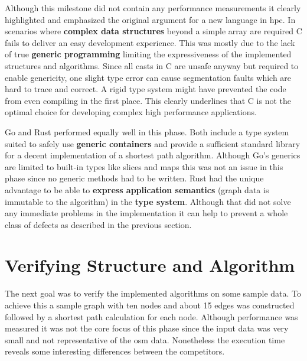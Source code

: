 Although this milestone did not contain any performance measurements it clearly highlighted and emphasized the original argument for a new language in \acrlong{hpc}. In scenarios where \textbf{complex data structures} beyond a simple array are required C fails to deliver an easy development experience. This was mostly due to the lack of true \textbf{generic programming} limiting the expressiveness of the implemented structures and algorithms. Since all casts in C are unsafe anyway but required to enable genericity, one slight type error can cause segmentation faults which are hard to trace and correct. A rigid type system might have prevented the code from even compiling in the first place. This clearly underlines that C is not the optimal choice for developing complex high performance applications.

Go and Rust performed equally well in this phase. Both include a type system suited to safely use \textbf{generic containers} and provide a sufficient standard library for a decent implementation of a shortest path algorithm. Although Go's generics are limited to built-in types like slices and maps this was not an issue in this phase since no generic methods had to be written. Rust had the unique advantage to be able to \textbf{express application semantics} (graph data is immutable to the algorithm) in the \textbf{type system}. Although that did not solve any immediate problems in the implementation it can help to prevent a whole class of defects as described in the previous section.

\section{Verifying Structure and Algorithm}
\label{sec:Implementation::Verification}

The next goal was to verify the implemented algorithms on some sample data. To achieve this a sample graph with ten nodes and about 15 edges was constructed followed by a shortest path calculation for each node. Although performance was measured it was not the core focus of this phase since the input data was very small and not representative of the \gls{osm} data. Nonetheless the execution time reveals some interesting differences between the competitors.

